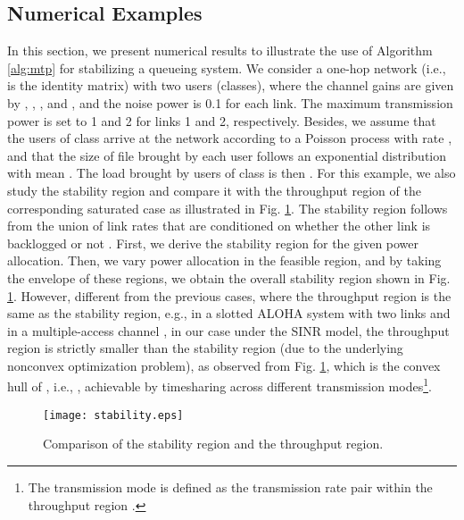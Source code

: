 \documentclass[10pt,journal,letterpaper,compsoc]{IEEEtran}
\begin{document}
{{\subsection{Numerical Examples}
In this section, we present numerical results to illustrate the use of Algorithm \ref{alg:mtp} for stabilizing a queueing system. We consider a one-hop network (i.e.,  is the identity matrix) with two users (classes), where the channel gains are given by , , , and , and the noise power is 0.1 for each link. The maximum transmission power is set to 1 and 2 for links 1 and 2, respectively. Besides, we assume that the users of class  arrive at the network according to a Poisson process with rate , and that the size of file brought by each user follows an exponential distribution with mean . The load brought by users of class  is then . For this example, we also study the stability region  and compare it with the throughput region  of the corresponding saturated case as illustrated in Fig. \ref{fig:stability region}. The stability region follows from the union of link rates that are conditioned on whether the other link is backlogged or not \cite{rao:1988,parande:2008}. First, we derive the stability region for the given power allocation. Then, we vary power allocation in the feasible region, and by taking the envelope of these regions, we obtain the overall stability region shown in Fig. \ref{fig:stability region}. However, different from the previous cases, where the throughput region is the same as the stability region, e.g., in a slotted ALOHA system with two links \cite{rao:1988} and in a multiple-access channel \cite{parande:2008}, in our case under the SINR model, the throughput region  is strictly smaller than the stability region (due to the underlying nonconvex optimization problem), as observed from Fig. \ref{fig:stability region}, which is the convex hull of , i.e., , achievable by timesharing across different transmission modes\footnote{The transmission mode is defined as the transmission rate pair within the throughput region .}.

\begin{figure}[t]
\begin{center}
\vspace{-0.0cm}\hspace{0cm} {\texttt{[image: stability.eps]}}\hspace{-0cm}
\vspace{0cm} \caption{Comparison of the stability region and the throughput region.}\vspace{-0.0cm}
\label{fig:stability region}
\end{center}
\end{figure}

}}
\end{document}
